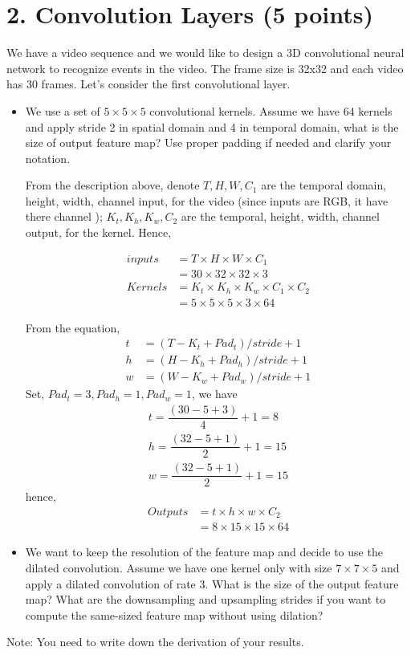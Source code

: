 \documentclass[12pt]{article}%
\begin{document}
\section*{2. Convolution Layers (5 points)}
We have a video sequence and we would like to design a 3D convolutional neural network to recognize events in the video. The frame size is 32x32 and each video has 30 frames. Let's consider the first convolutional layer.  
\begin{itemize}
	\item We use a set of $5\times 5\times 5$ convolutional kernels. Assume we have 64 kernels and apply stride 2 in spatial domain and 4 in temporal domain, what is the size of output feature map? Use proper padding if needed and clarify your notation.
	
	From the description above, denote $T, H, W, C_1$ are the temporal domain, height, width, channel input, for the video (since inputs are RGB, it have there channel ); $K_t, K_h, K_w, C_2$ are the temporal, height, width, channel output, for the kernel. Hence, 
	
	\begin{align*}
	inputs &= T \times H \times W \times C_1 \\
	&= 30 \times 32 \times 32 \times 3 \\
	Kernels &= K_t \times K_h \times K_w \times C_1 \times C_2 \\
	&= 5 \times 5 \times 5 \times 3 \times 64
	\end{align*}
	
	From the equation,
	\begin{align*}
	t &= (T - K_t + Pad_t)/stride + 1 \\
	h &= (H - K_h + Pad_h)/stride + 1 \\
	w &= (W - K_w + Pad_w)/stride + 1
	\end{align*}
	Set, $Pad_t = 3, Pad_h = 1, Pad_w = 1$, we have
	\begin{align*}
	t = \dfrac{(30 - 5 + 3)}{4} + 1 = 8\\
	h = \dfrac{(32 - 5 + 1)}{2} + 1 = 15 \\
	w = \dfrac{(32 - 5 + 1)}{2} + 1 = 15
	\end{align*}
	hence, 
	\begin{align*}
	Outputs &= t \times h \times w \times C_2 \\
	&= 8 \times 15 \times 15 \times 64
	\end{align*}
	 
	
	
	
	
	
	\item We want to keep the resolution of the feature map and decide to use the dilated convolution. Assume we have one kernel only with size $7\times 7\times 5$ and apply a dilated convolution of rate $3$. What is the size of the output feature map? What are the downsampling and upsampling strides if you want to compute the same-sized feature map without using dilation?   
\end{itemize}
Note: You need to write down the derivation of your results.\\
\end{document}
